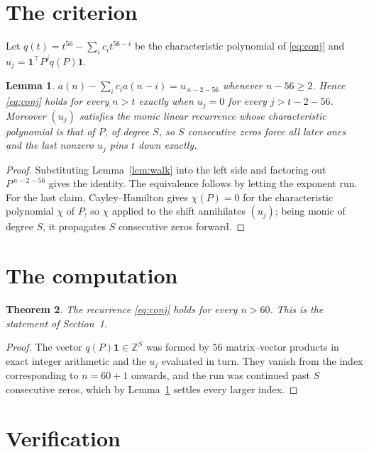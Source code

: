 \documentclass[11pt,a4paper]{article}
\theoremstyle{plain}
\newtheorem{theorem}{Theorem}
\newtheorem{lemma}[theorem]{Lemma}
\theoremstyle{definition}
\begin{document}
\section{The criterion}

Let $q(t)=t^{56}-\sum_i c_i t^{56-i}$ be the characteristic polynomial of
\eqref{eq:conj} and $u_j=\mathbf{1}^{\!\top}P^{j}q(P)\mathbf{1}$.

\begin{lemma}\label{lem:crit}
$a(n)-\sum_i c_i a(n-i)=u_{\,n-2-56}$ whenever $n-56\ge2$. Hence
\eqref{eq:conj} holds for every $n>t$ exactly when $u_j=0$ for every
$j>t-2-56$. Moreover $(u_j)$ satisfies the monic linear recurrence whose
characteristic polynomial is that of $P$, of degree $S$, so $S$ consecutive zeros force all
later ones and the last nonzero $u_j$ pins $t$ down exactly.
\end{lemma}

\begin{proof}
Substituting Lemma~\ref{lem:walk} into the left side and factoring out
$P^{\,n-2-56}$ gives the identity. The equivalence follows by letting the exponent
run. For the last claim, Cayley--Hamilton gives $\chi(P)=0$ for the characteristic
polynomial $\chi$ of $P$, so $\chi$ applied to the shift annihilates $(u_j)$; being monic of
degree $S$, it propagates $S$ consecutive zeros forward.
\end{proof}

\section{The computation}

\begin{theorem}
The recurrence \eqref{eq:conj} holds for every $n>60$. This is the statement of
Section~1.
\end{theorem}

\begin{proof}
The vector $q(P)\mathbf{1}\in\mathbb{Z}^{S}$ was formed by $56$ matrix--vector
products in exact integer arithmetic and the $u_j$ evaluated in turn. They vanish from the
index corresponding to $n=60+1$ onwards, and the run was continued past $S$ consecutive
zeros, which by Lemma~\ref{lem:crit} settles every larger index.
\end{proof}

\section{Verification}
\end{document}
